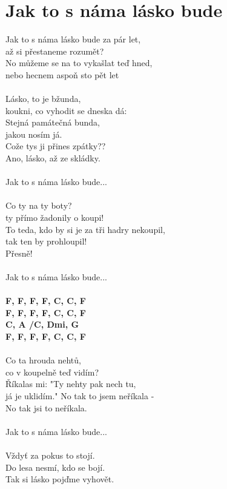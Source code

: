 \section{Jak to s náma lásko bude}
\color{blue}
Jak to s náma lásko bude za pár let,\\
až si přestaneme rozumět?\\
\color{red}
No můžeme se na to vykašlat teď hned,\\
nebo hecnem aspoň sto pět let\\
\\
\color{blue}
Lásko, to je bžunda,\\
koukni, co vyhodit se dneska dá:\\
Stejná památečná bunda,\\
jakou nosím já.\\
\color{red}
Cože tys ji přines zpátky??\\
\color{blue}
Ano, lásko, až ze skládky.\\
\\
\color{red}
Jak to s náma lásko bude...\\
\\
Co ty na ty boty?\\
ty přímo žadonily o koupi!\\
\color{blue}
To teda, kdo by si je za tři hadry nekoupil,\\
tak ten by prohloupil!\\
\color{red}
Přesně!\\
\\
\color{blue}
Jak to s náma lásko bude...\\
\color{black}
\\
\footnotesize\textbf{F, F\maj, F\6, F\7, C\kr, C, F\\
F, F\maj, F\6, F\7, C\kr, C, F\\
C, A\7 /C\kr , Dmi, G\7\\
F, F\maj, F\6, F\7, C\kr, C, F}\\
\normalsize
\\
\color{red}
Co ta hrouda nehtů,\\
co v koupelně teď vidím?\\
\color{blue}
Říkalas mi: "Ty nehty pak nech tu,\\
já je uklidím."
\color{red}
No tak to jsem neříkala -\\
\color{blue}
No tak jsi to neříkala.\\
\\
\color{red}
Jak to s náma lásko bude...\\
\\
Vždyť za pokus to stojí.\\
\color{blue}
Do lesa nesmí, kdo se bojí.\\
\color{black}
Tak si lásko pojďme vyhovět.